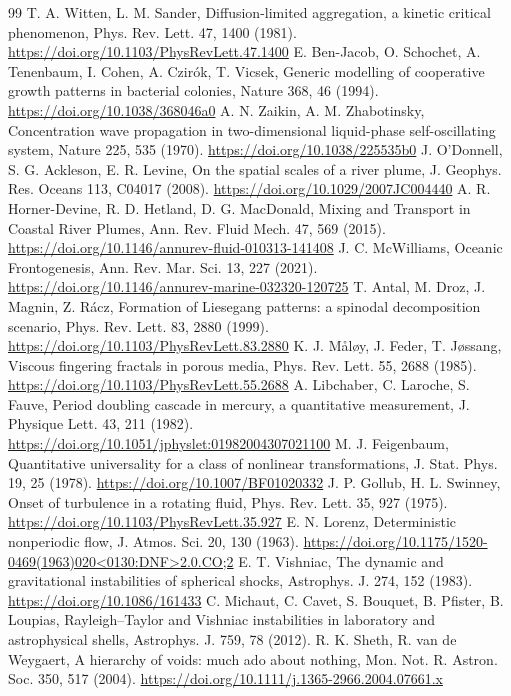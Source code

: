 \documentclass[11pt]{article}
\begin{document}
\begin{thebibliography}{99}
 T. A. Witten, L. M. Sander, Diffusion-limited aggregation, a kinetic critical phenomenon, Phys. Rev. Lett. 47, 1400 (1981). \url{https://doi.org/10.1103/PhysRevLett.47.1400}
 E. Ben-Jacob, O. Schochet, A. Tenenbaum, I. Cohen, A. Czirók, T. Vicsek, Generic modelling of cooperative growth patterns in bacterial colonies, Nature 368, 46 (1994). \url{https://doi.org/10.1038/368046a0}
 A. N. Zaikin, A. M. Zhabotinsky, Concentration wave propagation in two-dimensional liquid-phase self-oscillating system, Nature 225, 535 (1970). \url{https://doi.org/10.1038/225535b0}
 J. O'Donnell, S. G. Ackleson, E. R. Levine, On the spatial scales of a river plume, J. Geophys. Res. Oceans 113, C04017 (2008). \url{https://doi.org/10.1029/2007JC004440}
 A. R. Horner-Devine, R. D. Hetland, D. G. MacDonald, Mixing and Transport in Coastal River Plumes, Ann. Rev. Fluid Mech. 47, 569 (2015). \url{https://doi.org/10.1146/annurev-fluid-010313-141408}
 J. C. McWilliams, Oceanic Frontogenesis, Ann. Rev. Mar. Sci. 13, 227 (2021). \url{https://doi.org/10.1146/annurev-marine-032320-120725}
 T. Antal, M. Droz, J. Magnin, Z. Rácz, Formation of Liesegang patterns: a spinodal decomposition scenario, Phys. Rev. Lett. 83, 2880 (1999). \url{https://doi.org/10.1103/PhysRevLett.83.2880}
 K. J. Måløy, J. Feder, T. Jøssang, Viscous fingering fractals in porous media, Phys. Rev. Lett. 55, 2688 (1985). \url{https://doi.org/10.1103/PhysRevLett.55.2688}
 A. Libchaber, C. Laroche, S. Fauve, Period doubling cascade in mercury, a quantitative measurement, J. Physique Lett. 43, 211 (1982). \url{https://doi.org/10.1051/jphyslet:01982004307021100}
 M. J. Feigenbaum, Quantitative universality for a class of nonlinear transformations, J. Stat. Phys. 19, 25 (1978). \url{https://doi.org/10.1007/BF01020332}
 J. P. Gollub, H. L. Swinney, Onset of turbulence in a rotating fluid, Phys. Rev. Lett. 35, 927 (1975). \url{https://doi.org/10.1103/PhysRevLett.35.927}
 E. N. Lorenz, Deterministic nonperiodic flow, J. Atmos. Sci. 20, 130 (1963). \url{https://doi.org/10.1175/1520-0469(1963)020<0130:DNF>2.0.CO;2}
 E. T. Vishniac, The dynamic and gravitational instabilities of spherical shocks, Astrophys. J. 274, 152 (1983). \url{https://doi.org/10.1086/161433}
 C. Michaut, C. Cavet, S. Bouquet, B. Pfister, B. Loupias, Rayleigh--Taylor and Vishniac instabilities in laboratory and astrophysical shells, Astrophys. J. 759, 78 (2012).
 R. K. Sheth, R. van de Weygaert, A hierarchy of voids: much ado about nothing, Mon. Not. R. Astron. Soc. 350, 517 (2004). \url{https://doi.org/10.1111/j.1365-2966.2004.07661.x}
\end{thebibliography}
\endgroup
\end{document}
